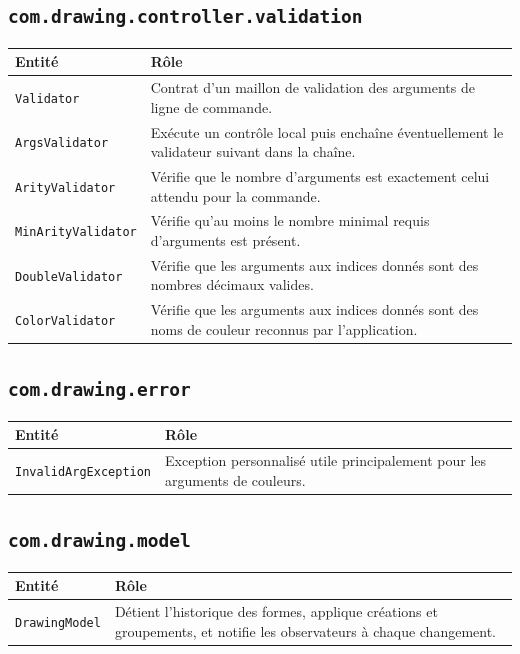 \documentclass[11pt,a4paper]{article}
\begin{document}
\subsection{\protect\texttt{com.drawing.controller.validation}}

\begin{tabular}{|>{\raggedright\arraybackslash}p{}|p{}|}
\hline
\textbf{Entité} & \textbf{Rôle} \\
\hline
\texttt{Validator} & Contrat d'un maillon de validation des arguments de ligne de commande. \\
\hline
\texttt{ArgsValidator} & Exécute un contrôle local puis enchaîne éventuellement le validateur suivant dans la chaîne. \\
\hline
\texttt{ArityValidator} & Vérifie que le nombre d'arguments est exactement celui attendu pour la commande. \\
\hline
\texttt{MinArityValidator} & Vérifie qu'au moins le nombre minimal requis d'arguments est présent. \\
\hline
\texttt{DoubleValidator} & Vérifie que les arguments aux indices donnés sont des nombres décimaux valides. \\
\hline
\texttt{ColorValidator} & Vérifie que les arguments aux indices donnés sont des noms de couleur reconnus par l'application. \\
\hline
\end{tabular}

\subsection{\protect\texttt{com.drawing.error}}

\begin{tabular}{|>{\raggedright\arraybackslash}p{}|p{}|}
\hline
\textbf{Entité} & \textbf{Rôle} \\
\hline
\texttt{InvalidArgException} & Exception personnalisé utile principalement pour les arguments de couleurs. \\
\hline
\end{tabular}

\subsection{\protect\texttt{com.drawing.model}}

\begin{tabular}{|>{\raggedright\arraybackslash}p{}|p{}|}
\hline
\textbf{Entité} & \textbf{Rôle} \\
\hline
\texttt{DrawingModel} & Détient l'historique des formes, applique créations et groupements, et notifie les observateurs à chaque changement. \\
\hline
\end{tabular}
\end{document}
